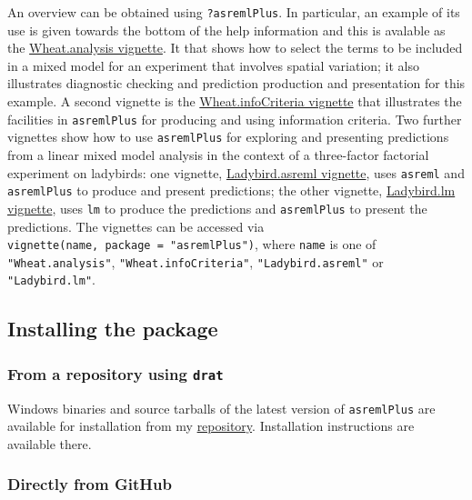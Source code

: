 \documentclass[
]{article}
\begin{document}
An overview can be obtained using \texttt{?asremlPlus}. In particular,
an example of its use is given towards the bottom of the help
information and this is avalable as the
\href{./vignettes/Wheat.analysis.pdf}{Wheat.analysis vignette}. It that
shows how to select the terms to be included in a mixed model for an
experiment that involves spatial variation; it also illustrates
diagnostic checking and prediction production and presentation for this
example. A second vignette is the
\href{./vignettes/Wheat.infoCriteria.pdf}{Wheat.infoCriteria vignette}
that illustrates the facilities in \texttt{asremlPlus} for producing and
using information criteria. Two further vignettes show how to use
\texttt{asremlPlus} for exploring and presenting predictions from a
linear mixed model analysis in the context of a three-factor factorial
experiment on ladybirds: one vignette,
\href{./vignettes/Ladybird.asreml.pdf}{Ladybird.asreml vignette}, uses
\texttt{asreml} and \texttt{asremlPlus} to produce and present
predictions; the other vignette,
\href{./vignettes/Ladybird.asreml.pdf}{Ladybird.lm vignette}, uses
\texttt{lm} to produce the predictions and \texttt{asremlPlus} to
present the predictions. The vignettes can be accessed via
\texttt{vignette(name,\ package\ =\ "asremlPlus")}, where \texttt{name}
is one of \texttt{"Wheat.analysis"}, \texttt{"Wheat.infoCriteria"},
\texttt{"Ladybird.asreml"} or \texttt{"Ladybird.lm"}.

\hypertarget{installing-the-package}{%
\subsection{Installing the package}\label{installing-the-package}}

\hypertarget{from-a-repository-using-drat}{%
\subsubsection{\texorpdfstring{From a repository using
\texttt{drat}}{From a repository using drat}}\label{from-a-repository-using-drat}}

Windows binaries and source tarballs of the latest version of
\texttt{asremlPlus} are available for installation from my
\href{http://chris.brien.name/rpackages}{repository}. Installation
instructions are available there.

\hypertarget{directly-from-github}{%
\subsubsection{Directly from GitHub}\label{directly-from-github}}
\end{document}
